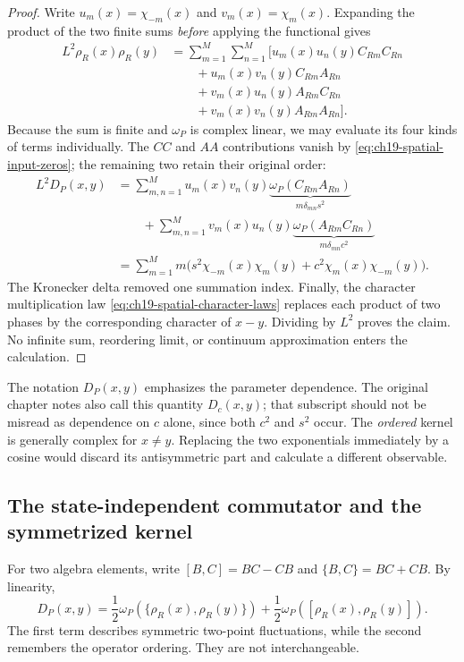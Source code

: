 \begin{proof}
Write $u_m(x)=\chi_{-m}(x)$ and $v_m(x)=\chi_m(x)$.
Expanding the product of the two finite sums \emph{before}
applying the functional gives
\begin{align*}
 L^2\rho_R(x)\rho_R(y)
 &=\sum_{m=1}^{M}\sum_{n=1}^{M}
  \bigl[u_m(x)u_n(y)C_{Rm}C_{Rn}\\
 &\qquad+u_m(x)v_n(y)C_{Rm}A_{Rn}\\
 &\qquad+v_m(x)u_n(y)A_{Rm}C_{Rn}\\
 &\qquad+v_m(x)v_n(y)A_{Rm}A_{Rn}\bigr].
\end{align*}
Because the sum is finite and $\omega_P$ is complex linear,
we may evaluate its four kinds of terms individually.  The $CC$
and $AA$ contributions vanish by
\eqref{eq:ch19-spatial-input-zeros}; the remaining two retain their
original order:
\begin{align*}
 L^2D_P(x,y)
 &=\sum_{m,n=1}^{M}u_m(x)v_n(y)
       \underbrace{\omega_P(C_{Rm}A_{Rn})}_{m\delta_{mn}s^2}\\
 &\qquad+\sum_{m,n=1}^{M}v_m(x)u_n(y)
       \underbrace{\omega_P(A_{Rm}C_{Rn})}_{m\delta_{mn}c^2}\\
 &=\sum_{m=1}^{M}m
  \bigl(s^2\chi_{-m}(x)\chi_m(y)
       +c^2\chi_m(x)\chi_{-m}(y)\bigr).
\end{align*}
The Kronecker delta removed one summation index.  Finally, the
character multiplication law
\eqref{eq:ch19-spatial-character-laws} replaces each product of two
phases by the corresponding character of $x-y$.  Dividing by $L^2$
proves the claim.  No infinite sum, reordering limit, or continuum
approximation enters the calculation.
\end{proof}

The notation $D_P(x,y)$ emphasizes the parameter dependence.  The
original chapter notes also call this quantity $D_c(x,y)$; that
subscript should not be misread as dependence on $c$ alone, since
both $c^2$ and $s^2$ occur.  The \emph{ordered} kernel is generally
complex for $x\neq y$.  Replacing the two exponentials immediately by
a cosine would discard its antisymmetric part and calculate a
different observable.

\subsection{The state-independent commutator and the symmetrized kernel}

For two algebra elements, write
$[B,C]=BC-CB$ and $\{B,C\}=BC+CB$.  By linearity,
\begin{equation}
 D_P(x,y)=\frac12\omega_P(\{\rho_R(x),\rho_R(y)\})
          +\frac12\omega_P([\rho_R(x),\rho_R(y)]).
 \label{eq:ch19-spatial-decomposition}
\end{equation}
The first term describes symmetric two-point fluctuations, while the
second remembers the operator ordering.  They are not interchangeable.

